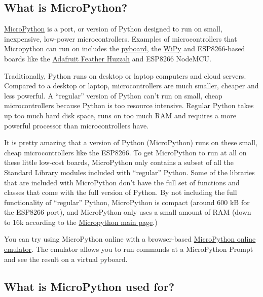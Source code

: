 \documentclass{book}
\begin{document}
    
        \hypertarget{what-is-micropython}{%
\subsection{What is MicroPython?}\label{what-is-micropython}}
    




    
        \href{http://micropython.org/}{MicroPython} is a port, or version of
Python designed to run on small, inexpensive, low-power
microcontrollers. Examples of microcontrollers that Micropython can run
on includes the \href{https://store.micropython.org/}{pyboard}, the
\href{https://pycom.io/development-boards}{WiPy} and ESP8266-based
boards like the
\href{https://learn.adafruit.com/adafruit-feather-huzzah-esp8266}{Adafruit
Feather Huzzah} and ESP8266 NodeMCU.

Traditionally, Python runs on desktop or laptop computers and cloud
servers. Compared to a desktop or laptop, microcontrollers are much
smaller, cheaper and less powerful. A ``regular'' version of Python
can't run on small, cheap microcontrollers because Python is too
resource intensive. Regular Python takes up too much hard disk space,
runs on too much RAM and requires a more powerful processor than
microcontrollers have.

It is pretty amazing that a version of Python (MicroPython) runs on
these small, cheap microcontrollers like the ESP8266. To get MicroPython
to run at all on these little low-cost boards, MicroPython only contains
a subset of all the Standard Library modules included with ``regular''
Python. Some of the libraries that are included with MicroPython don't
have the full set of functions and classes that come with the full
version of Python. By not including the full functionality of
``regular'' Python, MicroPython is compact (around 600 kB for the
ESP8266 port), and MicroPython only uses a small amount of RAM (down to
16k according to the \href{https://micropython.org/}{Micropython main
page}.)

You can try using MicroPython online with a browser-based
\href{https://micropython.org/unicorn/}{MicroPython online emulator}.
The emulator allows you to run commands at a MicroPython Prompt and see
the result on a virtual pyboard.
    




    
        \hypertarget{what-is-micropython-used-for}{%
\subsection{What is MicroPython used
for?}\label{what-is-micropython-used-for}}
    
\end{document}
